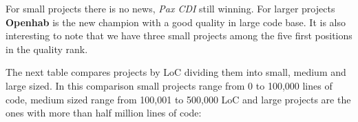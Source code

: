\begin{table}[htbp]
  \small
  \caption{Projects qualities by number of bundles}
  \label{projects-quality-bundle}
  \hspace{1cm}
\end{table}
\FloatBarrier  
For small projects there is no news, \emph{Pax CDI} still winning. For larger projects \textbf{Openhab} is the new champion with a good quality in large code base. It is also interesting to note that we have three small projects among the five first positions in the quality rank. 

The next table compares projects by LoC dividing them into small, medium and large sized. In this comparison small projects range from 0 to 100,000 lines of code, medium sized range from 100,001 to 500,000 LoC and large projects are the ones with more than half million lines of code:

